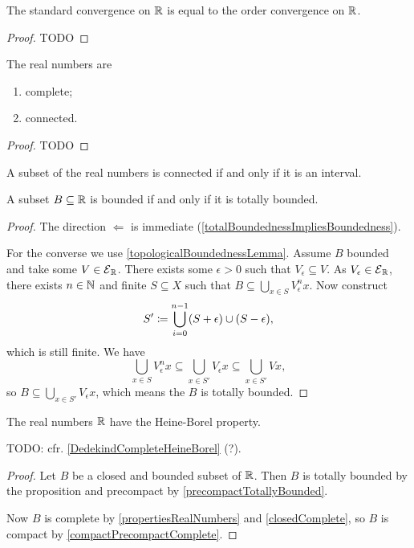 \begin{proposition} \label{realConvergenceOrderConvergence}
The standard convergence on $\mathbb{R}$ is equal to the order convergence on $\mathbb{R}$.
\end{proposition}
\begin{proof}
TODO
\end{proof}

\begin{proposition} \label{propertiesRealNumbers}
The real numbers are
\begin{enumerate}
\item complete;
\item connected.
\end{enumerate}
\end{proposition}
\begin{proof}
TODO
\end{proof}
\begin{lemma} \label{connectedSubsetReals}
A subset of the real numbers is connected \textup{if and only if} it is an interval.
\end{lemma}

\begin{proposition} \label{realBoundedIffTotallyBounded}
A subset $B\subseteq \mathbb{R}$ is bounded \textup{if and only if} it is totally bounded.
\end{proposition}
\begin{proof}
The direction $\Leftarrow$ is immediate (\ref{totalBoundednessImpliesBoundedness}).

For the converse we use \ref{topologicalBoundednessLemma}. Assume $B$ bounded and take some $V\in \operatorname{\mathcal{E}}_{\mathbb{R}}$. There exists some $\epsilon >0$ such that $V_\epsilon \subseteq V$. As $V_\epsilon \in \operatorname{\mathcal{E}}_{\mathbb{R}}$, there exists $n\in \mathbb{N}$ and finite $S\subseteq X$ such that $B\subseteq \bigcup_{x\in S}V_\epsilon^nx$.
Now construct
\[ S' \coloneqq \bigcup_{i=0}^{n-1} (S+\epsilon)\cup(S-\epsilon), \]
which is still finite. We have
\[ \bigcup_{x\in S}V_\epsilon^nx\subseteq \bigcup_{x\in S'}V_\epsilon x \subseteq \bigcup_{x\in S'}V x, \]
so $B\subseteq \bigcup_{x\in S'}V_\epsilon x$, which means the $B$ is totally bounded.
\end{proof}
\begin{corollary} \label{HeineBorel}
The real numbers $\mathbb{R}$ have the Heine-Borel property.
\end{corollary}
TODO: cfr. \ref{DedekindCompleteHeineBorel} (?).
\begin{proof}
Let $B$ be a closed and bounded subset of $\mathbb{R}$. Then $B$ is totally bounded by the proposition and precompact by \ref{precompactTotallyBounded}.

Now $B$ is complete by \ref{propertiesRealNumbers} and \ref{closedComplete}, so $B$ is compact by \ref{compactPrecompactComplete}.
\end{proof}

